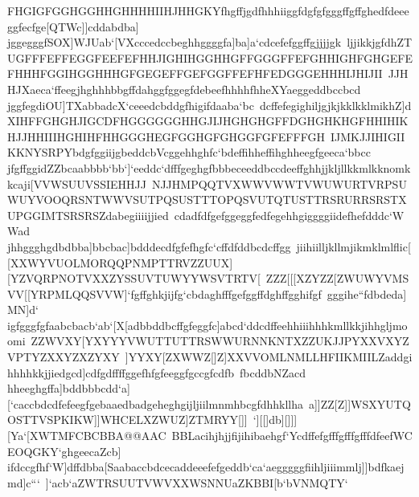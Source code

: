 {{{ FHGIGFGGHGGHHGHHHHIIHJHHGKYfhgffjgdfhhhiiggfdgfgfgggffgffghedfdeeeggfecfge[QTWc]]cddabdba]}
 \hbox{jggegggfSOX]WJUab`[VXcccedccbeghhggggfa]ba]a`cdcefefggffgjjjjgk%
 ljjikkjgfdhZTUGFFFEFFEGGFEEFEFHHJIGHIHGGHHGFFGGGFFEFGHHIGHFGHGEFEFHHHFGGIHGGHHHGFGEGEFFGEFGGFFEFHFEDGGGEHHHIJHIJII%
 JJHHJXaeca`ffeegjhghhhbbgffdahggfggegfdebeefhhhhfhheXYaeggeddbccbcd}
 \hbox{jggfegdiOU]TXabbadcX`ceeedcbddgfhigifdaaba`bc%
 dcffefegighiljgjkjkklkklmikhZ]dXIHFFGHGHJIGCDFHGGGGGGHHGJIJHGHGHGFFDGHGHKHGFHHIHIKHJJHHIIIHGHIHFHHGGGHEGFGGHGFGHGGFGFEFFFGH%
 IJMKJJIHIGIIKKNYSRPYbdgfggiijgbeddcbVcggehhghfc`bdeffihheffihghheegfgeeca`bbcc}
 \hbox{jfgffggidZZbcaabbbb`bb`]`eeddc`dfffgeghgfbbbeceeddbccdeeffghhjjkljllkkmlkknomkkcaji[VVWSUUVSSIEHHJJ%
 NJJHMPQQTVXWWVWWTVWUWURTVRPSUWUYVOOQRSNTWWVSUTPQSUSTTTOPQSVUTQTUSTTRSRURRSRSTXUPGGIMTSRSRSZdabegiiiijjied%
 cdadfdfgefggeggfedfegehhgiggggiidefhefdddc`WWad}
 \hbox{jhhggghgdbdbba]bbcbac]bdddecdfgfefhgfc`cffdfddbcdcffgg%
 jiihiilljkllmjikmklmlflic[[XXWYVUOLMORQQPNMPTTRVZZUUX][YZVQRPNOTVXXZYSSUVTUWYYWSVTRTV[%
 ZZZ[[[XZYZZ[ZWUWYVMSVV[[YRPMLQQSVVW]`fgffghkjijfg`cbdaghfffgefggffdghffgghifgf%
 gggihe``fdbdeda]MN]d`}
 \hbox{igfgggfgfaabcbacb`ab`[X[adbbddbcffgfeggfc]abcd`ddcdffeehhiiihhhkmllkkjihhgljmoomi%
 ZZWVXY[YXYYYVWUTTUTTRSWWURNNKNTXZZUKJJPYXXVXYZVPTYZXXYZXZYXY%
 ]YYXY[ZXWWZ[]Z]XXVVOMLNMLLHFIIKMIILZaddgihhhhkkjjiedgcd]cdfgdffffggefhfgfeeggfgccgfcdfb%
 fbcddbNZacd}
 \hbox{hheeghgffa]bddbbbcdd`a][`caccbdcdfefeegfgebaaedbadgeheghgijljiilmnmhbcgfdhhkllha%
 a]]ZZ[Z]]WSXYUTQOSTTVSPKIKW]]WHCELXZWUZ]ZTMRYY[]]%
 `][[]db][]]][Ya`[XWTMFCBCBBA@@AAC%
 BBLacihjhjjfijihibaehgf`YcdffefgfffgfffgfffdfeefWCEOQGKY`ghgeecaZcb]}
 \hbox{ifdccgfhf`W]dffdbba[Saabaccbdcecaddeeefefgeddb`ca`aegggggfiihljiiimmlj]]bdfkaejmd]c```%
 ]`acb`aZWTRSUUTVWVXXWSNNUaZKBBI[b`bVNMQTY`%
}}}
